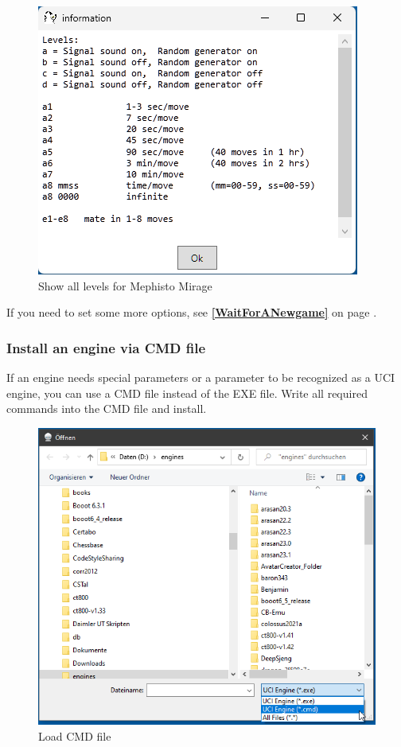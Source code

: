 \documentclass[11pt,a4paper]{article}
\begin{document}
\begin{figure}[H]
	\centering
	\includegraphics[scale=1.0]{MessChess6.png}
	\caption{Show all levels for Mephisto Mirage}
	\label{fig:MessChess6}
\end{figure}


If you need to set some more options, see \textbf{\ref{WaitForANewgame}  } on page \pageref{WaitForANewgame}.

\subsubsection{Install an engine via CMD file} \label{ViaCMDFile}
If an engine needs special parameters or a parameter to be recognized as a UCI engine, you can use a CMD file instead of the EXE file. Write all required commands into the CMD file and install.

\begin{figure}[H]
	\centering
	\includegraphics[scale=0.8]{LoadEngineCmd.png}
	\caption{Load CMD file}
	\label{fig:LoadCMDfile}
\end{figure}
\end{document}
